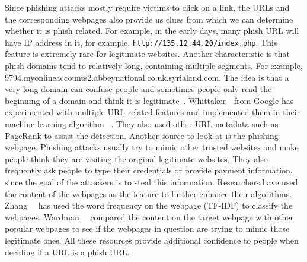 Since phishing attacks mostly require victims to click on a link, the URLs 
and the corresponding webpages also provide us clues from which we can 
determine whether it is phish related. For example, in the early days, many
phish URL will have IP address in it, for example, \texttt{http://135.12.44.20/index.php}. This feature is extremely rare for
legitimate websites. Another characteristic is that phish domains tend to
relatively long, containing multiple segments. For example, 9794.myonlineaccounts2.abbeynational.co.uk.syrialand.com. The idea is that
a very long domain can confuse people and sometimes people only read the 
beginning of a domain and think it is legitimate~\cite{wu2006security}.
Whittaker~\etal\ from Google has experimented with multiple URL related
features and implemented them in their machine learning algorithm
~\cite{whittaker2010large}. They also used other URL metadata such as PageRank
to assist the detection. Another source to look at is the phishing
webpage. Phishing attacks usually try to mimic other trusted websites and
make people think they are visiting the original legitimate websites. They
also frequently ask people to type their credentials or provide payment
information, since the goal of the attackers is to steal this information.
Researchers have used the content of the webpages as the feature to further
enhance their algorithms. Zhang~\etal~\cite{zhang2007cantina} has used 
the word frequency on the webpage (TF-IDF) to classify the webpages. Wardman~\etal~\cite{wardman2008automating} compared the content on the target webpage
with other popular webpages to see if the webpages in question are trying
to mimic those legitimate ones. All these resources provide additional
confidence to people when deciding if a URL is a phish URL.